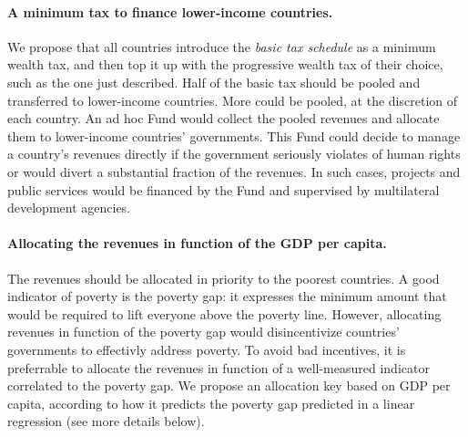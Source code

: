 \documentclass[12pt,english]{article}
\begin{document}
\paragraph{A minimum tax to finance lower-income countries.} We propose that all countries introduce the \textit{basic tax schedule} as a minimum wealth tax, and then top it up with the progressive wealth tax of their choice, such as the one just described. 
Half of the basic tax %
should be pooled and transferred to lower-income countries. More could be pooled, at the discretion of each country. %
An ad hoc Fund would collect the pooled revenues and allocate them to lower-income countries' governments. This Fund could decide to manage a country's revenues directly if the government seriously violates of human rights or would divert a substantial fraction of the revenues. In such cases, projects and public services would be financed by the Fund and supervised by multilateral development agencies. 

\paragraph{Allocating the revenues in function of the GDP per capita.} The revenues should be allocated in priority to the poorest countries. A good indicator of poverty is the poverty gap: it expresses the minimum amount that would be required to lift everyone above the poverty line. However, allocating revenues in function of the poverty gap would disincentivize countries' governments to effectivly address poverty. To avoid bad incentives, it is preferrable to allocate the revenues in function of a well-measured indicator correlated to the poverty gap. We propose an allocation key based on GDP per capita, according to how it predicts the poverty gap predicted in a linear regression (see more details below). 


\end{document}
